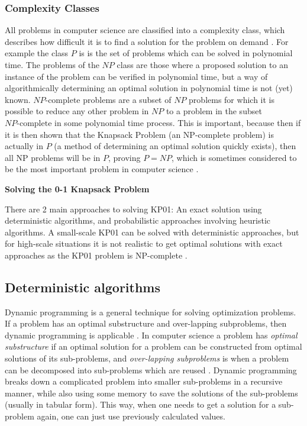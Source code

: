 \documentclass[titlepage]{article}
\begin{document}
\subsubsection*{Complexity Classes}
All problems in computer science are classified into a complexity class, which describes how difficult it is to find a solution for the problem on demand \cite{complexity-class}. For example the class $P$ is is the set of problems which can be solved in polynomial time. The problems of the $NP$ class are those where a proposed solution to an instance of the problem can be verified in polynomial time, but a way of algorithmically determining an optimal solution in polynomial time is not (yet) known. $NP\text{-complete}$ problems are a subset of $NP$ problems for which it is possible to reduce any other problem in $NP$ to a problem in the subset $NP\text{-complete}$ in some polynomial time process. This is important, because then if it is then shown that the Knapsack Problem (an NP-complete problem) is actually in $P$ (a method of determining an optimal solution quickly exists), then all NP problems will be in $P$, proving $P=NP$, which is sometimes considered to be the most important problem in computer science \cite{PvsNP}. 

\textbf{Solving the 0-1 Knapsack Problem} \mbox{}\

There are 2 main approaches to solving KP01: An exact solution using deterministic algorithms, and probabilistic approaches involving heuristic algorithms. A small-scale KP01 can be solved with deterministic approaches, but for high-scale situations it is not realistic to get optimal solutions with exact approaches \cite{QWPA} as the KP01 problem is NP-complete \cite{KPNP}. 

\subsection*{Deterministic algorithms}
Dynamic programming is a general technique for solving optimization problems. If a problem has an optimal substructure and over-lapping subproblems, then dynamic programming is applicable . In computer science a problem has \emph{optimal substructure} if an optimal solution for a problem can be constructed from optimal solutions of its sub-problems, and \emph{over-lapping subproblems} is when a problem can be decomposed into sub-problems which are reused \cite{optimalSubstructure}. Dynamic programming breaks down a complicated problem into smaller sub-problems in a recursive manner, while also using some memory to save the solutions of the sub-problems (usually in tabular form). This way, when one needs to get a solution for a sub-problem again, one can just use previously calculated values. 
\end{document}
